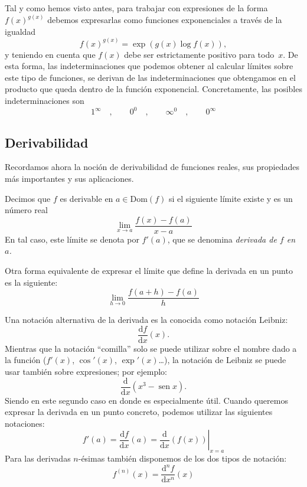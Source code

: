 Tal y como hemos visto antes,
para trabajar con expresiones de la forma $f(x)^{g(x)}$ debemos expresarlas como funciones exponenciales a través de la igualdad
\[
f(x)^{g(x)} =\exp(g(x)\log f(x)),
\]
y teniendo en cuenta que $f(x)$ debe ser estrictamente positivo para todo~$x$.
De esta forma, las indeterminaciones que podemos obtener al calcular límites sobre este tipo de funciones, se derivan de las indeterminaciones que obtengamos en el producto que queda dentro de la función exponencial.
Concretamente, las posibles indeterminaciones son
\[
1^\infty
\quad,\qquad
0^0
\quad,\qquad
\infty^0
\quad,\qquad
0^\infty
\]

\subsection{Derivabilidad}

Recordamos ahora la noción de derivabilidad de funciones reales, sus propiedades más importantes y sus aplicaciones.

\begin{definicion}
Decimos que $f$ es derivable en $a\in\mathrm{Dom}(f)$ si el siguiente límite existe y es un número real
\[
\lim_{x\to a}\dfrac{f(x)-f(a)}{x-a}
\]
En tal caso, este límite se denota por $f'(a)$, que se denomina \emph{derivada de $f$ en $a$.}
\end{definicion}

Otra forma equivalente de expresar el límite que define la derivada en un punto es la siguiente:
\[
\lim_{h\to 0}\dfrac{f(a+h)-f(a)}{h}
\]

Una notación alternativa de la derivada es la conocida como notación Leibniz:
\[
\frac{\mathrm{d}f}{\mathrm{d}x}(x).
\]
Mientras que la notación ``comilla'' solo se puede utilizar sobre el nombre dado a la función ($f'(x)$, $\cos'(x)$, $\exp'(x)$\dots), la notación de Leibniz se puede usar también sobre expresiones; por ejemplo:
\[
\frac{\mathrm{d}}{\mathrm{d}x}(x^3-\operatorname{sen} x).
\]
Siendo en este segundo caso en donde es especialmente útil.
Cuando queremos expresar la derivada en un punto concreto, podemos utilizar las siguientes notaciones:
\[
f'(a)=\frac{\mathrm{d}f}{\mathrm{d}x}(a)=\left.\frac{\mathrm{d}}{\mathrm{d}x}(f(x))\right|_{x=a}
\]
Para las derivadas $n$-ésimas también disponemos de los dos tipos de notación:
\[
f^{(n)}(x) = \frac{\mathrm{d}^nf}{\mathrm{d}x^n}(x)
\]

